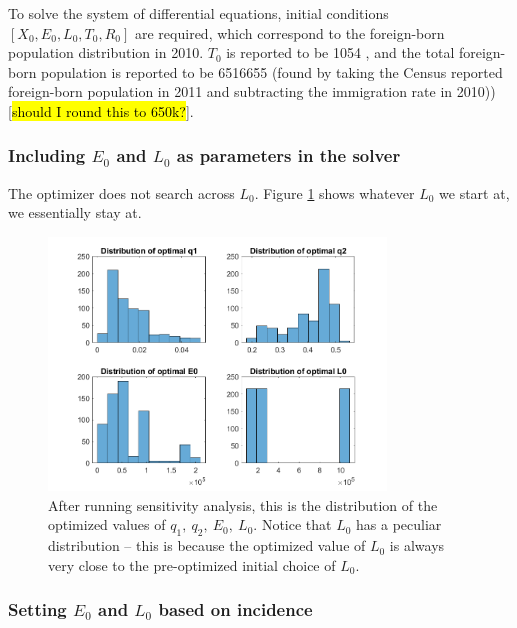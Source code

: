 \documentclass[sn-mathphys,Numbered]{sn-jnl}%
\theoremstyle{thmstyleone}%
\theoremstyle{thmstyletwo}%
\theoremstyle{thmstylethree}%
\begin{document}
To solve the system of differential equations, initial conditions $[X_0, E_0, L_0, T_0, R_0]$ are required, which correspond to the foreign-born population distribution in 2010.  $T_0$ is reported to be 1054 \cite{MounchiliA.2022TuberculosisReport}, and the total foreign-born population is reported to be 6516655 (found by taking the Census reported foreign-born population in 2011 and subtracting the immigration rate in 2010)) [\hl{should I round this to 650k?}].

\subsubsection{Including $E_0$ and $L_0$ as parameters in the solver}

The optimizer does not search across $L_0$.  Figure \ref{fig:OptimizedParameterDistribution4param} shows whatever $L_0$ we start at, we essentially stay at. 

\begin{figure}
\centering 
    \includegraphics[width=0.8\textwidth]{Optimized parameter distribution across sensitivity analysis.png}


    \caption{After running sensitivity analysis, this is the distribution of the optimized values of $q_1,~q_2,~E_0,~L_0.$  Notice that $L_0$ has a peculiar distribution -- this is because the optimized value of $L_0$ is always very close to the pre-optimized initial choice of $L_0$.}
    \label{fig:OptimizedParameterDistribution4param}
\end{figure}


\subsubsection{Setting $E_0$ and $L_0$ based on incidence}
\end{document}
